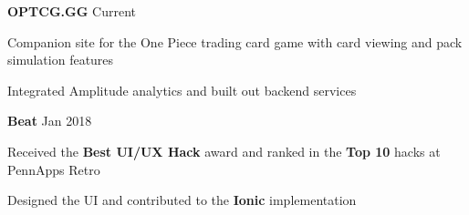 



\begin{cventries}


\cventry
{\textbf{OPTCG.GG }\href{https://www.optcg.gg}{\faShareSquare}}
{Current} %
{ %
\begin{cvitems}
\item {Companion site for the One Piece trading card game with card viewing and pack simulation features}
\item {Integrated Amplitude analytics and built out backend services}
\end{cvitems}
}





\cventry
{\textbf{Beat }\href{https://devpost.com/software/beat}{\faShareSquare}}
{Jan 2018} %
{ %
\begin{cvitems}
\item {Received the \textbf{Best UI/UX Hack} award and ranked in the \textbf{Top 10} hacks at PennApps Retro}
\item {Designed the UI and contributed to the \textbf{Ionic} implementation}
\end{cvitems}
}


\end{cventries}

